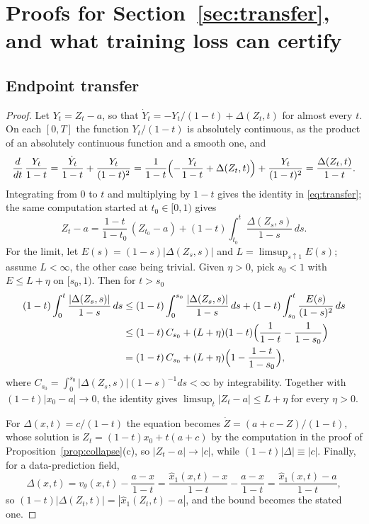 \documentclass{article} %
\makeatletter
\newif\ificlr
\newcommand{\placeblock}[1]{\ificlr\@nameuse{moved@#1}\fi}
\theoremstyle{plain}
\theoremstyle{definition}
\theoremstyle{remark}
\makeatother
\begin{document}
\section{Proofs for Section~\ref{sec:transfer}, and what training loss can certify}
\label{app:transfer}

\subsection{Endpoint transfer}
\label{apx:pf-transfer-all}

\label{apx:pf-transfer}
\thmtransfer*
\begin{proof}
Let $Y_t=Z_t-a$, so that $\dot Y_t=-Y_t/(1-t)+\Delta(Z_t,t)$ for almost every $t$. On each $[0,T]$
the function $Y_t/(1-t)$ is absolutely continuous, as the product of an absolutely continuous
function and a smooth one, and
\[
\frac{d}{dt}\,\frac{Y_t}{1-t}=\frac{\dot Y_t}{1-t}+\frac{Y_t}{(1-t)^2}
=\frac{1}{1-t}\Bigl(-\frac{Y_t}{1-t}+\Delta(Z_t,t)\Bigr)+\frac{Y_t}{(1-t)^2}
=\frac{\Delta(Z_t,t)}{1-t}.
\]
Integrating from $0$ to $t$ and multiplying by $1-t$ gives the identity in \eqref{eq:transfer}; the
same computation started at $t_0\in[0,1)$ gives
\begin{equation}
Z_t-a=\frac{1-t}{1-t_0}\,(Z_{t_0}-a)+(1-t)\int_{t_0}^t\frac{\Delta(Z_s,s)}{1-s}\,ds .
\label{eq:pf:transfer-t0}
\end{equation}
For the limit, let $E(s)=(1-s)|\Delta(Z_s,s)|$ and $L=\limsup_{s\uparrow1}E(s)$; assume
$L<\infty$, the other case being trivial. Given $\eta>0$, pick $s_0<1$ with $E\le L+\eta$ on
$[s_0,1)$. Then for $t>s_0$
\begin{align*}
(1-t)\int_0^t\frac{|\Delta(Z_s,s)|}{1-s}\,ds
&\le(1-t)\int_0^{s_0}\frac{|\Delta(Z_s,s)|}{1-s}\,ds+(1-t)\int_{s_0}^t\frac{E(s)}{(1-s)^2}\,ds\\
&\le(1-t)\,C_{s_0}+(L+\eta)(1-t)\Bigl(\frac1{1-t}-\frac1{1-s_0}\Bigr)\\
&=(1-t)\,C_{s_0}+(L+\eta)\Bigl(1-\frac{1-t}{1-s_0}\Bigr),
\end{align*}
where $C_{s_0}=\int_0^{s_0}|\Delta(Z_s,s)|(1-s)^{-1}ds<\infty$ by integrability. Together with
$(1-t)|x_0-a|\to0$, the identity gives $\limsup_t|Z_t-a|\le L+\eta$ for every $\eta>0$.

For $\Delta(x,t)=c/(1-t)$ the equation becomes $\dot Z=(a+c-Z)/(1-t)$, whose solution is
$Z_t=(1-t)x_0+t(a+c)$ by the computation in the proof of Proposition~\ref{prop:collapse}(c), so
$|Z_t-a|\to|c|$, while $(1-t)|\Delta|\equiv|c|$. Finally, for a data-prediction field,
\[
\Delta(x,t)=v_\theta(x,t)-\frac{a-x}{1-t}=\frac{\hat x_1(x,t)-x}{1-t}-\frac{a-x}{1-t}
=\frac{\hat x_1(x,t)-a}{1-t},
\]
so $(1-t)|\Delta(Z_t,t)|=|\hat x_1(Z_t,t)-a|$, and the bound becomes the stated one.
\end{proof}
\placeblock{transferreading}
\end{document}
